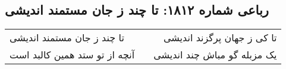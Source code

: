 \begin{center}
\section*{رباعی شماره ۱۸۱۲: تا چند ز جان مستمند اندیشی}
\label{sec:1812}
\begin{longtable}{l p{0.5cm} r}
تا چند ز جان مستمند اندیشی
&&
تا کی ز جهان پرگزند اندیشی
\\
آنچه از تو ستد همین کالبد است
&&
یک مزبله گو مباش چند اندیشی
\\
\end{longtable}
\end{center}
